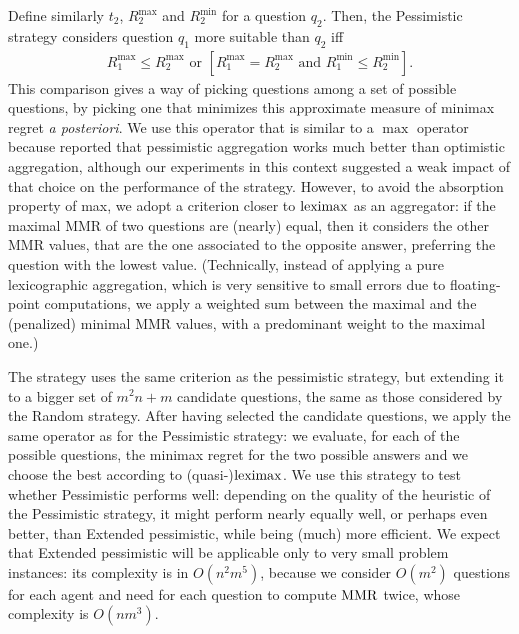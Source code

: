 \documentclass[sigconf, anonymous]{aamas}
\begin{document}
Define similarly $t_2$, $R^{\max}_2$ and $R^{\min}_2$ for a question $q_2$.
Then, the Pessimistic strategy considers question $q_1$ more suitable than $q_2$ iff
\begin{align}
	R^{\max}_1 ≤ R^{\max}_2 \text{ or } [R^{\max}_1 = R^{\max}_2 \text{ and } R^{\min}_1 ≤ R^{\min}_2].
\end{align}
This comparison gives a way of picking questions among a set of possible questions, by picking one that minimizes this approximate measure of minimax regret {\em a posteriori}. 
We use this operator that is similar to a $\max$ operator because \citet{Cailloux2014} reported that pessimistic aggregation works much better than optimistic aggregation, although our experiments in this context suggested a weak impact of that choice on the performance of the strategy.
However, to avoid the absorption property of max, we adopt a criterion closer to $\operatorname{leximax}$ as an aggregator: if the maximal MMR of two questions are (nearly) equal, then it considers the other MMR values, that are the one associated to the opposite answer, preferring the question with the lowest value.
(Technically, instead of applying a pure lexicographic aggregation, which is very sensitive to small errors due to floating-point computations, we apply a weighted sum between the maximal and the (penalized) minimal MMR values, with a predominant weight to the maximal one.)

The  strategy uses the same criterion as the pessimistic strategy, but extending it to a bigger set of $m^2 n + m$ candidate questions, the same as those considered by the Random strategy.
After having selected the candidate questions, we apply the same operator as for the Pessimistic strategy: we evaluate, for each of the possible questions, the minimax regret for the two possible answers and we choose the best according to (quasi-)$\operatorname{leximax}$.
We use this strategy to test whether Pessimistic performs well: depending on the quality of the heuristic of the Pessimistic strategy, it might perform nearly equally well, or perhaps even better, than Extended pessimistic, while being (much) more efficient. We expect that Extended pessimistic will be applicable only to very small problem instances: its complexity is in $O(n^2 m^5)$, because we consider $O(m^2)$ questions for each agent and need for each question to compute $\operatorname{MMR}$ twice, whose complexity is $O(nm^3)$.
\end{document}
